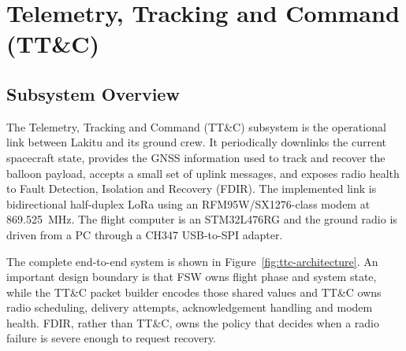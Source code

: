 \chapter{Telemetry, Tracking and Command (TT\&C)}

\newcommand{\ttcfield}[1]{{\ttfamily\footnotesize\detokenize{#1}}}

\section{Subsystem Overview}

The Telemetry, Tracking and Command (TT\&C) subsystem is the operational link
between Lakitu and its ground crew. It periodically downlinks the current
spacecraft state, provides the GNSS information used to track and recover the
balloon payload, accepts a small set of uplink messages, and exposes radio
health to Fault Detection, Isolation and Recovery (FDIR). The implemented link
is bidirectional half-duplex LoRa using an RFM95W/SX1276-class modem at
869.525~MHz. The flight computer is an STM32L476RG and the ground radio is driven
from a PC through a CH347 USB-to-SPI adapter.

The complete end-to-end system is shown in Figure~\ref{fig:ttc-architecture}.
An important design boundary is that FSW owns flight phase and system state,
while the TT\&C packet builder encodes those shared values and TT\&C owns radio
scheduling, delivery attempts, acknowledgement handling and modem health.
FDIR, rather than TT\&C, owns the
policy that decides when a radio failure is severe enough to request recovery.

